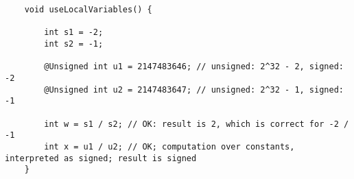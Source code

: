 \begin{Verbatim}
    void useLocalVariables() {

        int s1 = -2;
        int s2 = -1;

        @Unsigned int u1 = 2147483646; // unsigned: 2^32 - 2, signed: -2
        @Unsigned int u2 = 2147483647; // unsigned: 2^32 - 1, signed: -1

        int w = s1 / s2; // OK: result is 2, which is correct for -2 / -1
        int x = u1 / u2; // OK; computation over constants, interpreted as signed; result is signed
    }
\end{Verbatim}
